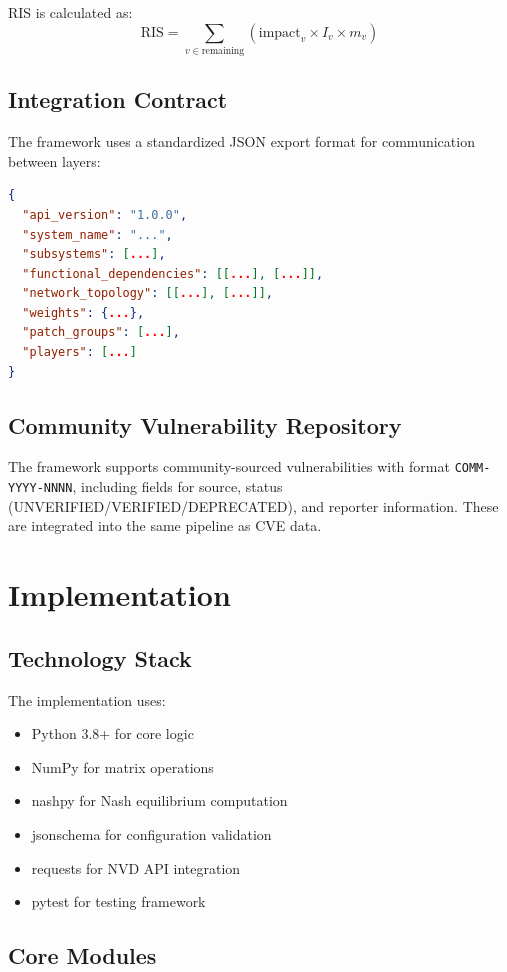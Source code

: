 \documentclass[conference]{IEEEtran}
\begin{document}
RIS is calculated as:
\begin{equation}
\text{RIS} = \sum_{v \in \text{remaining}} \left( \text{impact}_v \times I_v \times m_v \right)
\end{equation}

\subsection{Integration Contract}
The framework uses a standardized JSON export format for communication between layers:

\begin{lstlisting}[language=JSON, basicstyle=\small]
{
  "api_version": "1.0.0",
  "system_name": "...",
  "subsystems": [...],
  "functional_dependencies": [[...], [...]],
  "network_topology": [[...], [...]],
  "weights": {...},
  "patch_groups": [...],
  "players": [...]
}
\end{lstlisting}

\subsection{Community Vulnerability Repository}
The framework supports community-sourced vulnerabilities with format \texttt{COMM-YYYY-NNNN}, including fields for source, status (UNVERIFIED/VERIFIED/DEPRECATED), and reporter information. These are integrated into the same pipeline as CVE data.

\section{Implementation}

\subsection{Technology Stack}
The implementation uses:
\begin{itemize}
    \item Python 3.8+ for core logic
    \item NumPy for matrix operations
    \item nashpy for Nash equilibrium computation
    \item jsonschema for configuration validation
    \item requests for NVD API integration
    \item pytest for testing framework
\end{itemize}

\subsection{Core Modules}
\end{document}
